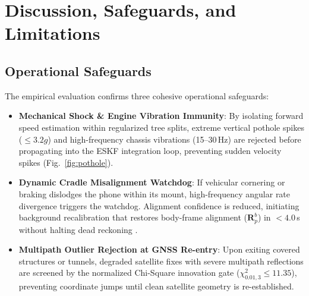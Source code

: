 \documentclass[conference]{IEEEtran}
\begin{document}
\section{Discussion, Safeguards, and Limitations}

\subsection{Operational Safeguards}
The empirical evaluation confirms three cohesive operational safeguards:
\begin{itemize}
\item \textbf{Mechanical Shock \& Engine Vibration Immunity}: By isolating forward speed estimation within regularized tree splits, extreme vertical pothole spikes ($\le 3.2g$) and high-frequency chassis vibrations (15--30\,Hz) are rejected before propagating into the ESKF integration loop, preventing sudden velocity spikes (Fig.~\ref{fig:pothole}).
\item \textbf{Dynamic Cradle Misalignment Watchdog}: If vehicular cornering or braking dislodges the phone within its mount, high-frequency angular rate divergence triggers the watchdog. Alignment confidence is reduced, initiating background recalibration that restores body-frame alignment ($\mathbf{R}_p^b$) in $<4.0$\,s without halting dead reckoning \cite{matos2025}.
\item \textbf{Multipath Outlier Rejection at GNSS Re-entry}: Upon exiting covered structures or tunnels, degraded satellite fixes with severe multipath reflections are screened by the normalized Chi-Square innovation gate ($\chi^2_{0.01, 3} \le 11.35$), preventing coordinate jumps until clean satellite geometry is re-established.
\end{itemize}
\end{document}
